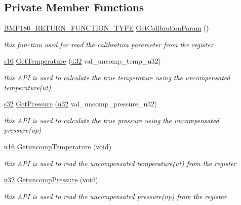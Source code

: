 \subsection*{Private Member Functions}
\begin{DoxyCompactItemize}
\item 
\hyperlink{BMP180_8hpp_a0b2541dda714686ae536954aaf5c3387}{B\+M\+P180\+\_\+\+R\+E\+T\+U\+R\+N\+\_\+\+F\+U\+N\+C\+T\+I\+O\+N\+\_\+\+T\+Y\+PE} \hyperlink{classBMP180_abb79348f8b34037cd2a8edbb68b6062c}{Get\+Calibration\+Param} ()
\begin{DoxyCompactList}\small\item\em this function used for read the calibration parameter from the register \end{DoxyCompactList}\item 
\hyperlink{BMP180_8hpp_aa980e2c02ba2305e0f489d5650655425}{s16} \hyperlink{classBMP180_acaf2a12c4a90f0023eda1115639fd203}{Get\+Temperature} (\hyperlink{BMP180_8hpp_afaa62991928fb9fb18ff0db62a040aba}{u32} val\+\_\+uncomp\+\_\+temp\+\_\+u32)
\begin{DoxyCompactList}\small\item\em this A\+PI is used to calculate the true temperature using the uncompensated temperature(ut) \end{DoxyCompactList}\item 
\hyperlink{BMP180_8hpp_ae9b1af5c037e57a98884758875d3a7c4}{s32} \hyperlink{classBMP180_a2e2dcaced0cf3693329857c8ddc8ec32}{Get\+Pressure} (\hyperlink{BMP180_8hpp_afaa62991928fb9fb18ff0db62a040aba}{u32} val\+\_\+uncomp\+\_\+pressure\+\_\+u32)
\begin{DoxyCompactList}\small\item\em this A\+PI is used to calculate the true pressure using the uncompensated pressure(up) \end{DoxyCompactList}\item 
\hyperlink{BMP180_8hpp_ace9d960e74685e2cd84b36132dbbf8aa}{u16} \hyperlink{classBMP180_a4aeb21cd2930e32319bc5e033cc543a0}{Getuncomp\+Temperature} (void)
\begin{DoxyCompactList}\small\item\em this A\+PI is used to read the uncompensated temperature(ut) from the register \end{DoxyCompactList}\item 
\hyperlink{BMP180_8hpp_afaa62991928fb9fb18ff0db62a040aba}{u32} \hyperlink{classBMP180_ab24151206af58316d6f3c2f1c99286bd}{Getuncomp\+Pressure} (void)
\begin{DoxyCompactList}\small\item\em this A\+PI is used to read the uncompensated pressure(up) from the register \end{DoxyCompactList}\end{DoxyCompactItemize}

